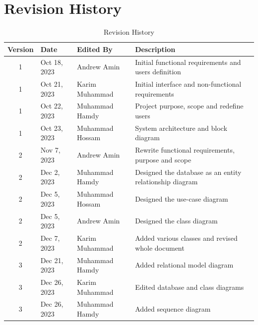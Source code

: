 \documentclass{BusMateSRS}
\date{December 27, 2023}
\def\nameAndrew{Andrew Amin}
\def\nameKarim{Karim Muhammad}
\def\nameHamdy{Muhammad Hamdy}
\def\nameHossam{Muhammad Hossam}
\begin{document}
\maketitle
\tableofcontents
\listoffigures
\listoftables

\chapter*{Revision History}
\begin{table}[ht!]
	\centering
	\begin{tabularx}{\textwidth}{|c|l|l|X|}
		\hline
		\textbf{Version} & \textbf{Date} & \textbf{Edited By} & \textbf{Description} \\
		\hline
		1                & Oct 18, 2023  & \nameAndrew        &
		Initial functional requirements and users definition                         \\
		\hline
		1                & Oct 21, 2023  & \nameKarim         &
		Initial interface and non-functional requirements                            \\
		\hline
		1                & Oct 22, 2023  & \nameHamdy         &
		Project purpose, scope and redefine users                                    \\
		\hline
		1                & Oct 23, 2023  & \nameHossam        &
		System architecture and block diagram                                        \\
		\hline
		2                & Nov 7, 2023   & \nameAndrew        &
		Rewrite functional requirements, purpose and scope                           \\
		\hline
		2                & Dec 2, 2023   & \nameHamdy         &
		Designed the database as an entity relationship diagram                      \\
		\hline
		2                & Dec 5, 2023   & \nameHossam        &
		Designed the use-case diagram                                                \\
		\hline
		2                & Dec 5, 2023   & \nameAndrew        &
		Designed the class diagram                                                   \\
		\hline
		2                & Dec 7, 2023   & \nameKarim         &
		Added various classes and revised whole document                             \\
		\hline
		3                & Dec 21, 2023   & \nameHamdy        &
		Added relational model diagram                                               \\
		\hline
		3                & Dec 26, 2023   & \nameKarim &
		Edited database and class diagrams \\
		\hline
		3                & Dec 26, 2023   & \nameHamdy        &
		Added sequence diagram \\
		\hline
	\end{tabularx}
	\caption{Revision History}
	\label{tab:revision-history}
\end{table}
\end{document}
